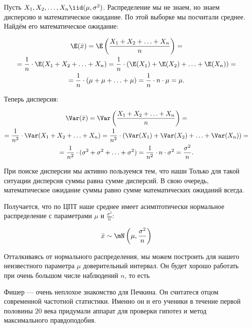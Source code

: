 \documentclass[12pt, a4paper, oneside]{article}
\begin{document}
\begin{sol} 
Пусть $X_1, X_2, \ldots, X_n \iid (\mu, \sigma^2)$. Распределение мы не знаем, но знаем дисперсию и математическое ожидание. По этой выборке мы посчитали среднее. Найдём его математическое ожидание: 

\begin{multline*}
\E(\bar{x}) = \E \left(\frac{X_1 + X_2 + \ldots + X_n}{n}\right) = \\ = \frac{1}{n} \cdot \E(X_1 + X_2 + \ldots + X_n) = \frac{1}{n} \cdot (\E(X_1) + \E(X_2) + \ldots + \E(X_n))  = \\ = \frac{1}{n} \cdot (\mu + \mu + \ldots + \mu) = \frac{1}{n} \cdot n \cdot \mu = \mu.
\end{multline*}

 Теперь дисперсия: 

\begin{multline*}
\Var(\bar{x}) = \Var \left(\frac{X_1 + X_2 + \ldots + X_n}{n}\right) = \\ = \frac{1}{n^2} \cdot \Var(X_1 + X_2 + \ldots + X_n) = \frac{1}{n^2} \cdot (\Var(X_1) + \Var(X_2) + \ldots + \Var(X_n))  = \\ = \frac{1}{n^2} \cdot (\sigma^2 + \sigma^2 + \ldots + \sigma^2) = \frac{1}{n^2} \cdot n \cdot \sigma^2 = \frac{\sigma^2}{n}.
\end{multline*}

При поиске дисперсии мы активно пользуемся тем, что наши  Только для такой ситуации дисперсия суммы равна сумме дисперсий. В свою очередь, математическое ожидание суммы равно сумме математических ожиданий всегда. 

Получается, что по ЦПТ наше среднее имеет асимптотически нормальное распределение с параметрами $\mu$ и $\frac{\sigma^2}{n}$:

$$
\bar{x} \sim \mN \left(\mu, \frac{\sigma^2}{n} \right)
$$

Отталкиваясь от нормального распределения, мы можем построить для нашего неизвестного параметра $\mu$ доверительный интервал. Он будет хорошо работать при очень большом числе наблюдений $n$, то есть 

Фишер --- очень неплохое знакомство для Печкина. Он считатеся отцом современной частотной статистики. Именно он и его ученики в течение первой половины $20$ века придумали аппарат для проверки гипотез и метод максимального правдоподобия.
\end{sol} 
\end{document}
